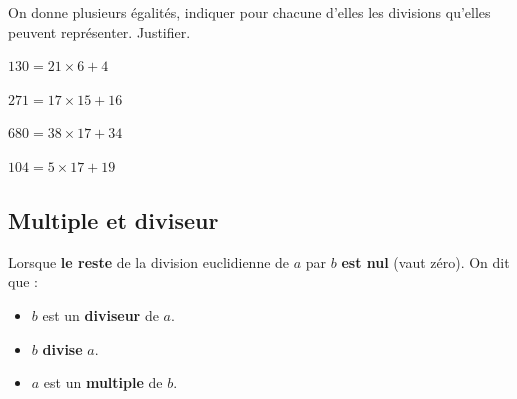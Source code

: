 \documentclass[a4paper]{book}
\begin{document}
    \begin{exemple}
        On donne plusieurs égalités, indiquer pour chacune d'elles les divisions qu'elles peuvent représenter. Justifier.

        \begin{minipage}{0.24\linewidth}
            $130=21\times6+4$
            
            \vspace{3cm}
        \end{minipage}
        \hfill
        \vline
        \hfill
        \begin{minipage}{0.24\linewidth}
            $271=17\times15+16$
             
            \vspace{3cm}
        \end{minipage}
        \hfill
        \vline
        \hfill
        \begin{minipage}{0.24\linewidth}
            $680=38\times17+34$
            
            \vspace{3cm}
        \end{minipage}
                \hfill
        \vline
        \hfill
        \begin{minipage}{0.24\linewidth}
            $104=5\times17+19$
            
            \vspace{3cm}
        \end{minipage}
    \end{exemple}


\subsection{Multiple et diviseur}
    
    \begin{definition}
        Lorsque \textbf{le reste} de la division euclidienne de $a$ par $b$ \textbf{est nul} (vaut zéro). On dit que :

        \begin{itemize}
            \item $b$ est un \textbf{diviseur} de $a$.
            \item $b$ \textbf{divise} $a$.
            \item $a$ est un \textbf{multiple} de $b$.
        \end{itemize}
    \end{definition}
\end{document}
